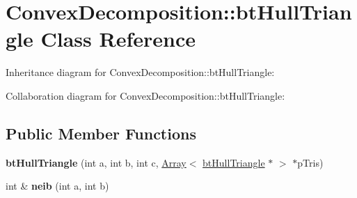 \hypertarget{class_convex_decomposition_1_1bt_hull_triangle}{\section{Convex\+Decomposition\+:\+:bt\+Hull\+Triangle Class Reference}
\label{class_convex_decomposition_1_1bt_hull_triangle}
}


Inheritance diagram for Convex\+Decomposition\+:\+:bt\+Hull\+Triangle\+:


Collaboration diagram for Convex\+Decomposition\+:\+:bt\+Hull\+Triangle\+:
\subsection*{Public Member Functions}
\begin{DoxyCompactItemize}
\item 
\hypertarget{class_convex_decomposition_1_1bt_hull_triangle_a0c1e3553f11bbdc9d9af8a41978c0d97}{{\bfseries bt\+Hull\+Triangle} (int a, int b, int c, \hyperlink{class_convex_decomposition_1_1_array}{Array}$<$ \hyperlink{class_convex_decomposition_1_1bt_hull_triangle}{bt\+Hull\+Triangle} $\ast$ $>$ $\ast$p\+Tris)}\label{class_convex_decomposition_1_1bt_hull_triangle_a0c1e3553f11bbdc9d9af8a41978c0d97}

\item 
\hypertarget{class_convex_decomposition_1_1bt_hull_triangle_a85baf5520041d90f16f6972c57b8391c}{int \& {\bfseries neib} (int a, int b)}\label{class_convex_decomposition_1_1bt_hull_triangle_a85baf5520041d90f16f6972c57b8391c}

\end{DoxyCompactItemize}
